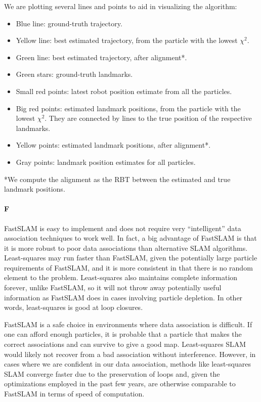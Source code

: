 \documentclass[12pt]{article}
\begin{document}
We are plotting several lines and points to aid in visualizing the algorithm:
\begin{itemize}
	\item Blue line: ground-truth trajectory.
	\item Yellow line: best estimated trajectory, from the particle with the lowest $\chi^2$.
	\item Green line: best estimated trajectory, after alignment*.
	\item Green stars: ground-truth landmarks.
	\item Small red points: latest robot position estimate from all the particles.
	\item Big red points: estimated landmark positions, from the particle with the lowest $\chi^2$. They are connected by lines to the true position of the respective landmarks.
	\item Yellow points: estimated landmark positions, after alignment*.
	\item Gray points: landmark position estimates for all particles.
\end{itemize}

*We compute the alignment as the RBT between the estimated and true landmark positions.

\paragraph{F}
FastSLAM is easy to implement and does not require very ``intelligent'' data
association techniques to work well. In fact, a big advantage of FastSLAM is
that it is more robust to poor data associations than alternative SLAM
algorithms. Least-squares may run faster than FastSLAM, given the potentially
large particle requirements of FastSLAM, and it is more consistent in that
there is no random element to the problem. Least-squares also maintains
complete information forever, unlike FastSLAM, so it will not throw away
potentially useful information as FastSLAM does in cases involving particle
depletion. In other words, least-squares is good at loop closures.

FastSLAM is a safe choice in environments where data association is difficult.
If one can afford enough particles, it is probable that a particle that makes
the correct associations and can survive to give a good map. Least-squares SLAM
would likely not recover from a bad association without interference. However,
in cases where we are confident in our data association, methods like
least-squares SLAM converge faster due to the preservation of loops and, given
the optimizations employed in the past few years, are otherwise comparable to
FastSLAM in terms of speed of computation.
\end{document}
